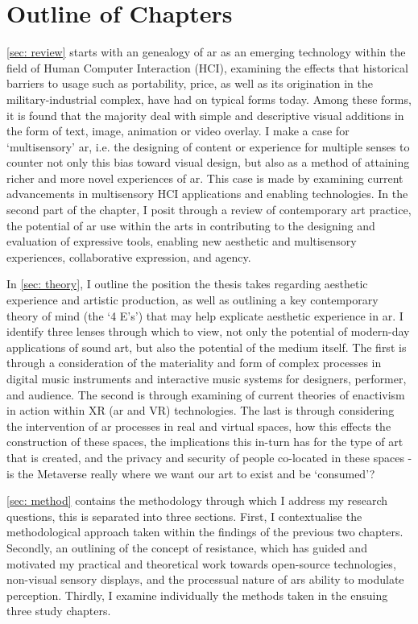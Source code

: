 \section{Outline of Chapters}\label{sec: introduction-outline}
\autoref{sec: review} starts with an genealogy of \gls{ar} as an emerging technology within the field of Human Computer Interaction (HCI), examining the effects that historical barriers to usage such as portability, price, as well as its origination in the military-industrial complex, have had on typical forms today. Among these forms, it is found that the majority deal with simple and descriptive visual additions in the form of text, image, animation or video overlay. I make a case for `multisensory' \gls{ar}, i.e. the designing of content or experience for multiple senses to counter not only this bias toward visual design, but also as a method of attaining richer and more novel experiences of \gls{ar}. This case is made by examining current advancements in multisensory HCI applications and enabling technologies. In the second part of the chapter, I posit through a review of contemporary art practice, the potential of \gls{ar} use within the arts in contributing to the designing and evaluation of expressive tools, enabling new aesthetic and multisensory experiences, collaborative expression, and agency.

In \autoref{sec: theory}, I outline the position the thesis takes regarding aesthetic experience and artistic production, as well as outlining a key contemporary theory of mind (the `4 E's') that may help explicate aesthetic experience in \gls{ar}. I identify three lenses through which to view, not only the potential of modern-day applications of sound \gls{art}, but also the potential of the medium itself. The first is through a consideration of the materiality and form of complex processes in digital music instruments and interactive music systems for designers, performer, and audience. The second is through examining of current theories of enactivism in action within XR (\gls{ar} and VR) technologies. The last is through considering the intervention of \gls{ar} processes in real and virtual spaces, how this effects the construction of these spaces, the implications this in-turn has for the type of art that is created, and the privacy and security of people co-located in these spaces - is the Metaverse really where we want our \gls{art} to exist and be `consumed'? 

\autoref{sec: method} contains the methodology through which I address my research questions, this is separated into three sections. First, I contextualise the methodological approach taken within the findings of the previous two chapters. Secondly, an outlining of the concept of resistance, which has guided and motivated my practical and theoretical work towards open-source technologies, non-visual sensory displays, and the processual nature of \glspl{ar} ability to modulate perception. Thirdly, I examine individually the methods taken in the ensuing three study chapters.
 
